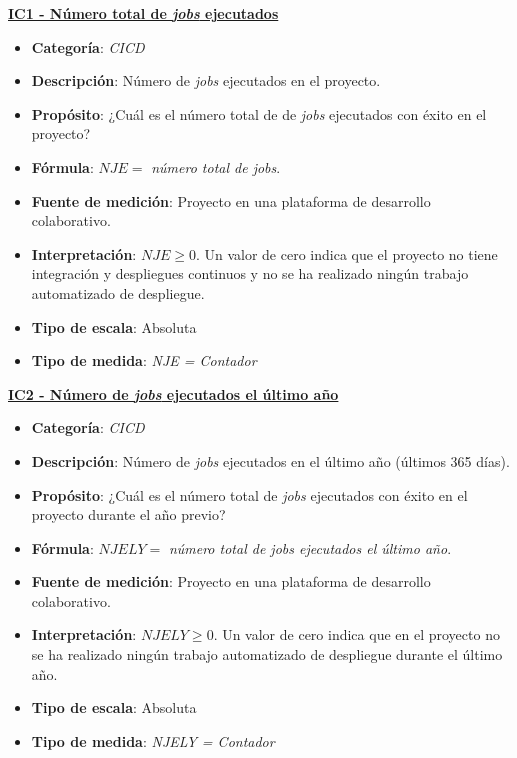 \textbf{\underline{IC1 - Número total de \textit{jobs} ejecutados}}
\begin{itemize}
	\item \textbf{Categoría}: \textit{CICD}
	\item \textbf{Descripción}: Número de \textit{jobs} ejecutados en el proyecto.
	\item \textbf{Propósito}: ¿Cuál es el número total de de \textit{jobs} ejecutados con éxito en el proyecto?
	\item \textbf{Fórmula}: $NJE =$ \textit{número total de jobs}.
	\item \textbf{Fuente de medición}: Proyecto en una plataforma de desarrollo colaborativo.
	\item \textbf{Interpretación}: $NJE \geq 0$. Un valor de cero indica que el proyecto no tiene integración y despliegues continuos y no se ha realizado ningún trabajo automatizado de despliegue.
	\item \textbf{Tipo de escala}: Absoluta
	\item \textbf{Tipo de medida}: \textit{NJE = Contador}
\end{itemize}

\textbf{\underline{IC2 - Número de \textit{jobs} ejecutados el último año}}
\begin{itemize}
	\item \textbf{Categoría}: \textit{CICD}
	\item \textbf{Descripción}: Número de \textit{jobs} ejecutados en el último año (últimos 365 días).
	\item \textbf{Propósito}: ¿Cuál es el número total de \textit{jobs} ejecutados con éxito en el proyecto durante el año previo?
	\item \textbf{Fórmula}: $NJELY =$ \textit{número total de jobs ejecutados el último año}.
	\item \textbf{Fuente de medición}: Proyecto en una plataforma de desarrollo colaborativo.
	\item \textbf{Interpretación}: $NJELY \geq 0$. Un valor de cero indica que en el proyecto no se ha realizado ningún trabajo automatizado de despliegue durante el último año.
	\item \textbf{Tipo de escala}: Absoluta
	\item \textbf{Tipo de medida}: \textit{NJELY = Contador}
\end{itemize}


